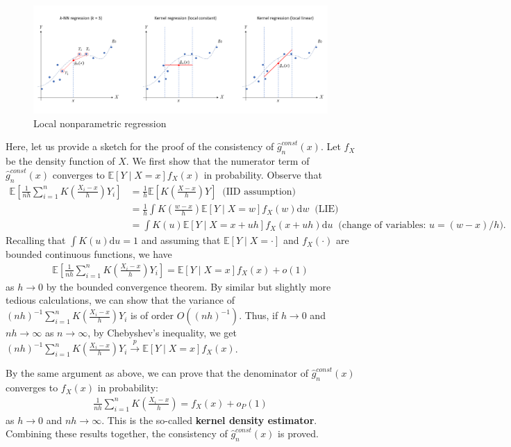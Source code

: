 \documentclass[10.5pt, A4paper, openany, uplatex]{book}
\newcommand{\E}{\mathbb{E}}
\renewcommand{\hat}{\widehat}
\numberwithin{equation}{section}
\begin{document}
\begin{figure}[h!]
	\begin{center}
		\includegraphics[width = 18cm]{localreg.png}
		\caption{Local nonparametric regression}
	\end{center}
\end{figure}

Here, let us provide a sketch for the proof of the consistency of $\hat g^{const}_n(x)$.
Let $f_X$ be the density function of $X$.
We first show that the numerator term of $\hat g^{const}_n(x)$ converges to $\E[Y \mid X = x]f_X(x)$ in probability.
Observe that
\begin{align*}
	\E\left[\frac{1}{nh} \sum_{i = 1}^n K\left( \frac{X_i - x}{h}\right) Y_i \right] 
	& = \frac{1}{h}\E\left[ K\left( \frac{X - x}{h}\right) Y \right] \;\; \text{(IID assumption)}\\
	& = \frac{1}{h}\int K\left( \frac{w - x}{h}\right) \E[ Y \mid X = w] f_X (w)\text{d}w \;\; \text{(LIE)} \\
	& = \int K(u) \E[ Y \mid X = x + uh] f_X (x + uh)\text{d}u \;\; \text{(change of variables: $u = (w-x)/h$)}.
\end{align*}
Recalling that $\int K(u)\text{d}u = 1$ and assuming that $\E[ Y \mid X = \cdot]$ and $f_X (\cdot)$ are bounded continuous functions, we have 
\begin{align*}
	\E\left[\frac{1}{nh} \sum_{i = 1}^n K\left( \frac{X_i - x}{h}\right) Y_i \right] = \E[ Y \mid X = x] f_X (x) + o(1)
\end{align*}
as $h \to 0$ by the bounded convergence theorem.
By similar but slightly more tedious calculations, we can show that the variance of $(nh)^{-1} \sum_{i = 1}^n K\left( \frac{X_i - x}{h}\right) Y_i$ is of order $O((nh)^{-1})$.
Thus, if $h \to 0$ and $nh \to \infty$ as $n \to \infty$, by Chebyshev's inequality, we get $(nh)^{-1} \sum_{i = 1}^n K\left( \frac{X_i - x}{h}\right) Y_i \overset{p}{\to} \E[ Y \mid X = x] f_X (x)$.

By the same argument as above, we can prove that the denominator of $\hat g^{const}_n(x)$ converges to $f_X(x)$ in probability:
\begin{align*}
	\frac{1}{nh}\sum_{i = 1}^n K\left( \frac{X_i - x}{h}\right) = f_X(x) + o_P(1)
\end{align*}
as $h \to 0$ and $nh \to \infty$.
This is the so-called \textbf{kernel density estimator}.
Combining these results together, the consistency of $\hat g^{const}_n(x)$ is proved.
\end{document}
